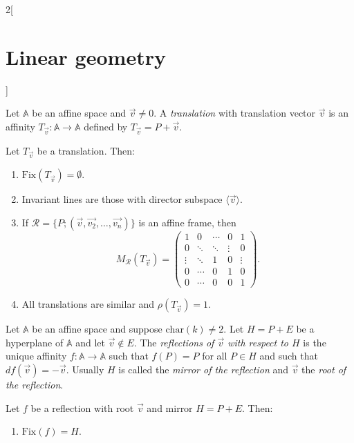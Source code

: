 \documentclass[class=article,10pt,crop=false]{standalone}
\begin{document}
\begin{multicols}{2}[\section{Linear geometry}]
\begin{definition}[Translations]
Let $\mathbb{A}$ be an affine space and $\overrightarrow{v}\ne 0$. A \textit{translation} with translation vector $\overrightarrow{v}$ is an affinity $T_{\overrightarrow{v}}:\mathbb{A}\rightarrow\mathbb{A}$ defined by $T_{\overrightarrow{v}}=P+\overrightarrow{v}$.
\end{definition}
\begin{prop}
Let $T_{\overrightarrow{v}}$ be a translation. Then:
\begin{enumerate}
    \item $\text{Fix}(T_{\overrightarrow{v}})=\emptyset$.
    \item Invariant lines are those with director subspace $\langle\overrightarrow{v}\rangle$.
    \item If $\mathcal{R}=\{P;(\overrightarrow{v},\overrightarrow{v_2},\ldots,\overrightarrow{v_n})\}$ is an affine frame, then $$M_\mathcal{R}(T_{\overrightarrow{v}})=\left(\begin{array}{cccc|c}
        1 & 0 & \cdots & 0 & 1\\
        0 & \ddots & \ddots & \vdots  & 0\\
        \vdots & \ddots & 1 & 0 & \vdots\\
        0 & \cdots & 0 & 1 & 0\\
        \hline
        0 & \cdots & 0 & 0 &  1
    \end{array}\right).$$
    \item All translations are similar and $\rho(T_{\overrightarrow{v}})=1$.
\end{enumerate}
\end{prop}
\begin{definition}[Reflections]
Let $\mathbb{A}$ be an affine space and suppose $\text{char}(k)\ne 2$. Let $H=P+E$ be a hyperplane of $\mathbb{A}$ and let $\overrightarrow{v}\notin E$. The \textit{reflections of $\overrightarrow{v}$ with respect to $H$} is the unique affinity $f:\mathbb{A}\rightarrow\mathbb{A}$ such that $f(P)=P$ for all $P\in H$ and such that $df(\overrightarrow{v})=-\overrightarrow{v}$. Usually $H$ is called the \textit{mirror of the reflection} and $\overrightarrow{v}$ the \textit{root of the reflection}.
\end{definition}
\begin{prop}
Let $f$ be a reflection with root $\overrightarrow{v}$ and mirror $H=P+E$. Then:
\begin{enumerate}
    \item $\text{Fix}(f)=H$.

\end{enumerate}
\end{prop}
\end{multicols}
\end{document}
